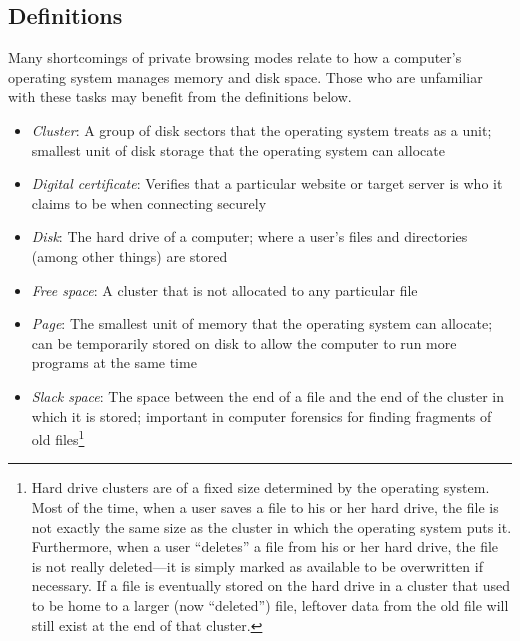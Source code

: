 \documentclass[pdftex,letterpaper,titlepage,12pt]{article}
\begin{document}
    \subsection{Definitions}
    Many shortcomings of private browsing modes relate to how a computer's 
    operating system manages memory and disk space. Those who are unfamiliar
    with these tasks may benefit from the definitions below.
   
    \singlespacing
    \begin{itemize}
      \item \emph{Cluster}: A group of disk sectors that the operating system
      treats as a unit; smallest unit of disk storage that the operating
      system can allocate
      \item \emph{Digital certificate}: Verifies that a particular website or 
      target server is who it claims to be when connecting securely
      \item \emph{Disk}: The hard drive of a computer; where a user's files and
      directories (among other things) are stored
      \item \emph{Free space}: A cluster that is not allocated to any 
      particular file
      \item \emph{Page}: The smallest unit of memory that the operating system 
      can allocate; can be temporarily stored on disk to allow the computer to 
      run more programs at the same time
      \item \emph{Slack space}: The space between the end of a file and the end
      of the cluster in which it is stored; important in computer forensics for
      finding fragments of old files\footnote{Hard drive clusters are of a 
      fixed size determined by the operating system. Most of the time, when a 
      user saves a file to his or her hard drive, the file is not exactly the 
      same size as the cluster in which the operating system puts it. 
      Furthermore, when a user ``deletes'' a file from his or her hard drive, 
      the file is not really deleted---it is simply marked as available to be
      overwritten if necessary. If a file is eventually stored on the hard 
      drive in a cluster that used to be home to a larger (now ``deleted'') 
      file, leftover data from the old file will still exist at the end of that
      cluster.}
    \end{itemize}
    
  \doublespacing
\end{document}
